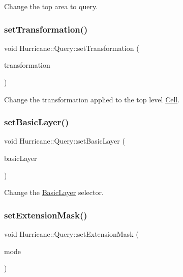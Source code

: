 Change the top area to query. \mbox{\label{classHurricane_1_1Query_a885360fc2f351fc3612c7dda363b5131}} 
\subsubsection{\texorpdfstring{set\+Transformation()}{setTransformation()}}
{\footnotesize\ttfamily void Hurricane\+::\+Query\+::set\+Transformation (\begin{DoxyParamCaption}\item[{const \hyperlink{classHurricane_1_1Transformation}{Transformation} \&}]{transformation }\end{DoxyParamCaption})\hspace{0.3cm}{\ttfamily [inline]}}

Change the transformation applied to the top level \hyperlink{classHurricane_1_1Cell}{Cell}. \mbox{\label{classHurricane_1_1Query_ac3718c4e2cd4d5e80af32558285481af}} 
\subsubsection{\texorpdfstring{set\+Basic\+Layer()}{setBasicLayer()}}
{\footnotesize\ttfamily void Hurricane\+::\+Query\+::set\+Basic\+Layer (\begin{DoxyParamCaption}\item[{const \hyperlink{classHurricane_1_1BasicLayer}{Basic\+Layer} $\ast$}]{basic\+Layer }\end{DoxyParamCaption})\hspace{0.3cm}{\ttfamily [virtual]}}

Change the \hyperlink{classHurricane_1_1BasicLayer}{Basic\+Layer} selector. \mbox{\label{classHurricane_1_1Query_af7f83fd3aefe1b5654f9bdd3566fe0d4}} 
\subsubsection{\texorpdfstring{set\+Extension\+Mask()}{setExtensionMask()}}
{\footnotesize\ttfamily void Hurricane\+::\+Query\+::set\+Extension\+Mask (\begin{DoxyParamCaption}\item[{Extension\+Slice\+::\+Mask}]{mode }\end{DoxyParamCaption})\hspace{0.3cm}{\ttfamily [inline]}}


